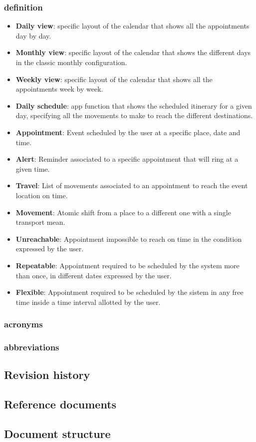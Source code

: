 \subsubsection{definition}
\begin{itemize}
	\item \textbf{Daily view}:   specific layout of the calendar that shows all the appointments day by day. 
	\item \textbf{Monthly view}: specific layout of the calendar that shows the different days in the classic monthly configuration.
	\item \textbf{Weekly view}: specific layout of the calendar that shows all the appointments week by week. 
	\item \textbf{Daily schedule}: app function that shows the scheduled itinerary for a given day, specifying all the movements to make to reach the different destinations.
	\item \textbf{Appointment}: Event scheduled by the user at a specific place, date and time.
	\item \textbf{Alert}: Reminder associated to a specific appointment that will ring at a given time.
	\item \textbf{Travel}: List of movements associated to an appointment to reach the event location on time.
	\item \textbf{Movement}: Atomic shift from a place to a different one with a single transport mean.
	\item \textbf{Unreachable}: Appointment impossible to reach on time in the condition expressed by the user.
	\item \textbf{Repeatable}: Appointment required to be scheduled by the system more than once, in different dates expressed by the user.
	\item \textbf{Flexible}: Appointment required to be scheduled by the sistem in any free time inside a time interval allotted by the user.
\end{itemize}
\subsubsection{acronyms}
\subsubsection{abbreviations}

\subsection{Revision history}
\subsection{Reference documents}
\subsection{Document structure}

